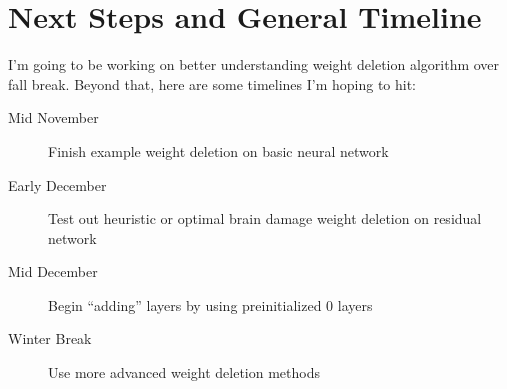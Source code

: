\documentclass[11pt]{article}
\begin{document}
\section{Next Steps and General Timeline}
I'm going to be working on better understanding weight deletion algorithm over fall break.
Beyond that, here are some timelines I'm hoping to hit:
\begin{description}
  \item[Mid November] Finish example weight deletion on basic neural network
  \item[Early December] Test out heuristic or optimal brain damage weight deletion on residual network
  \item[Mid December] Begin ``adding'' layers by using preinitialized 0 layers
  \item[Winter Break] Use more advanced weight deletion methods
\end{description}

\nocite{*}


\end{document}
